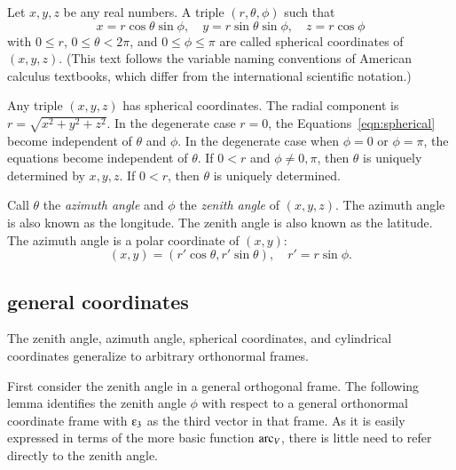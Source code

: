 \begin{definition}
Let $x,y,z$ be any real numbers.  A
triple $(r,\theta,\phi)$ such that
    \begin{equation}
    \label{eqn:spherical}
    x = r\cos\theta\sin\phi,\quad y = r\sin\theta\sin\phi,\quad
    z = r\cos\phi
    \end{equation}
with $0\le r$, $0\le\theta<2\pi$, and $0\le\phi\le\pi$ are called
spherical coordinates of $(x,y,z)$.  (This text follows the variable
naming conventions of American calculus textbooks, which differ
from the international scientific notation.)
\end{definition}
%
%
%
%
%

Any triple $(x,y,z)$ has spherical coordinates.
The radial component is $r = \sqrt{x^2+y^2+z^2}$.  In the degenerate case $r=0$,
the Equations~\ref{eqn:spherical} become independent of $\theta$
and $\phi$. In the degenerate case when $\phi = 0$ or $\phi =
\pi$, the equations become independent of $\theta$. If $0<r$ and $\phi\ne 0,\pi$,  then $\theta$ is uniquely
determined by $x,y,z$. If $0<r$, then $\theta$ is uniquely determined.


Call $\theta$ the {\it azimuth angle\/} and $\phi$ the {\it
zenith angle\/} of $(x,y,z)$.  The azimuth angle is also known as
the longitude.  The zenith angle is also known as the latitude. The
azimuth angle is a polar coordinate of $(x,y)$:
    $$
    (x,y) = (r'\cos\theta,r'\sin\theta), \quad r' = r\sin\phi.
    $$
%
%
%
%
%
%
%


\subsection{general coordinates}

%
The zenith angle, azimuth angle,
spherical coordinates, and cylindrical coordinates 
generalize to arbitrary orthonormal frames.

First consider the zenith angle in a general orthogonal frame.
The following lemma identifies the zenith angle $\phi$ with respect to
a general orthonormal coordinate frame with $\e_3$ as the third
vector in that frame.  As it is easily expressed in terms
of the more basic function $\operatorname{arc}_V$, 
there is little need to refer directly to the zenith angle.
%

